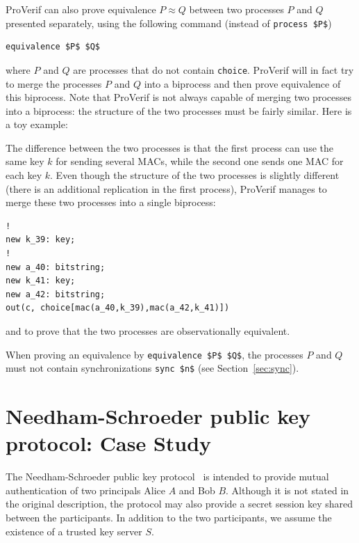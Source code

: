 \documentclass{book}
\newcommand{\A}{A}
\newcommand{\B}{B}
\newcommand{\T}{S}
\begin{document}
ProVerif can also prove equivalence $P \approx Q$
between two processes $P$ and $Q$ presented
separately, using the following command (instead of \lstinline!process $P$!)
\begin{lstlisting}[numbers=none]
equivalence $P$ $Q$
\end{lstlisting}
where $P$ and $Q$ are processes that do not contain \lstinline!choice!.
ProVerif will in fact try to merge the processes $P$ and $Q$ into a biprocess and then prove equivalence of this biprocess. Note that ProVerif is not always capable of merging two processes into a biprocess: the structure of the two processes must be fairly similar.
Here is a toy example:
%

%
The difference between the two processes is that the first process can
use the same key $k$ for sending several MACs, while the second one
sends one MAC for each key $k$. Even though the structure of the two
processes is slightly different (there is an additional replication in
the first process), ProVerif manages to merge these two processes into
a single biprocess:
\begin{lstlisting}
!
new k_39: key;
!
new a_40: bitstring;
new k_41: key;
new a_42: bitstring;
out(c, choice[mac(a_40,k_39),mac(a_42,k_41)])
\end{lstlisting}
and to prove that the two processes are observationally
equivalent.

When proving an equivalence by \lstinline!equivalence $P$ $Q$!,
the processes $P$ and $Q$ must not contain synchronizations
\lstinline !sync $n$! (see Section~\ref{sec:sync}).








\chapter[Needham-Schroeder: Case study]{Needham-Schroeder public key protocol: Case Study}\label{sec:caseStudy}

The Needham-Schroeder public key protocol~\cite{Needham78} is intended to provide mutual authentication of two principals Alice $\A$ and Bob $\B$. Although it is not stated in the original description, the protocol may also provide a secret session key shared between the participants. In addition to the two participants, we assume the existence of a trusted key server $\T$.
\end{document}
